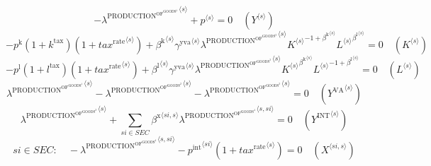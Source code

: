 \begin{equation}
-{\lambda^{\mathrm{PRODUCTION}^{\mathrm{OF}^{\mathrm{GOODS}^{\mathrm{1}}}}}}^{\langle s\rangle} + {p}^{\langle s\rangle} = 0
 \quad \left({Y}^{\langle s\rangle}\right)
\end{equation}
\begin{equation}
-{p^{\mathrm{k}}} \left(1 + k^{\mathrm{tax}}\right) \left(1 + {{t\!a\!x}^{\mathrm{rate}}}^{\langle s\rangle}\right) + {{\beta^{\mathrm{k}}}^{\langle s\rangle}} {{\gamma^{\mathrm{yva}}}^{\langle s\rangle}} {{\lambda^{\mathrm{PRODUCTION}^{\mathrm{OF}^{\mathrm{GOODS}^{\mathrm{3}}}}}}^{\langle s\rangle}} {{{K}^{\langle s\rangle}}^{-1 + {\beta^{\mathrm{k}}}^{\langle s\rangle}}} {{{L}^{\langle s\rangle}}^{{\beta^{\mathrm{l}}}^{\langle s\rangle}}} = 0
 \quad \left({K}^{\langle s\rangle}\right)
\end{equation}
\begin{equation}
-{p^{\mathrm{l}}} \left(1 + l^{\mathrm{tax}}\right) \left(1 + {{t\!a\!x}^{\mathrm{rate}}}^{\langle s\rangle}\right) + {{\beta^{\mathrm{l}}}^{\langle s\rangle}} {{\gamma^{\mathrm{yva}}}^{\langle s\rangle}} {{\lambda^{\mathrm{PRODUCTION}^{\mathrm{OF}^{\mathrm{GOODS}^{\mathrm{3}}}}}}^{\langle s\rangle}} {{{K}^{\langle s\rangle}}^{{\beta^{\mathrm{k}}}^{\langle s\rangle}}} {{{L}^{\langle s\rangle}}^{-1 + {\beta^{\mathrm{l}}}^{\langle s\rangle}}} = 0
 \quad \left({L}^{\langle s\rangle}\right)
\end{equation}
\begin{equation}
{\lambda^{\mathrm{PRODUCTION}^{\mathrm{OF}^{\mathrm{GOODS}^{\mathrm{1}}}}}}^{\langle s\rangle} - {\lambda^{\mathrm{PRODUCTION}^{\mathrm{OF}^{\mathrm{GOODS}^{\mathrm{2}}}}}}^{\langle s\rangle} - {\lambda^{\mathrm{PRODUCTION}^{\mathrm{OF}^{\mathrm{GOODS}^{\mathrm{3}}}}}}^{\langle s\rangle} = 0
 \quad \left({Y^{\mathrm{VA}}}^{\langle s\rangle}\right)
\end{equation}
\begin{equation}
{\lambda^{\mathrm{PRODUCTION}^{\mathrm{OF}^{\mathrm{GOODS}^{\mathrm{2}}}}}}^{\langle s\rangle} + \sum_{{s\!i}\in {S\!E\!C}} {{\beta^{\mathrm{x}}}^{\langle {s\!i},s\rangle}} {{\lambda^{\mathrm{PRODUCTION}^{\mathrm{OF}^{\mathrm{GOODS}^{\mathrm{4}}}}}}^{\langle s,{s\!i}\rangle}} = 0
 \quad \left({Y^{\mathrm{INT}}}^{\langle s\rangle}\right)
\end{equation}
\begin{equation}
{s\!i}\in {S\!E\!C}\colon\quad -{\lambda^{\mathrm{PRODUCTION}^{\mathrm{OF}^{\mathrm{GOODS}^{\mathrm{4}}}}}}^{\langle s,{s\!i}\rangle} - {{p^{\mathrm{int}}}^{\langle {s\!i}\rangle}} \left(1 + {{t\!a\!x}^{\mathrm{rate}}}^{\langle s\rangle}\right) = 0
 \quad \left({X}^{\langle {s\!i},s\rangle}\right)
\end{equation}


